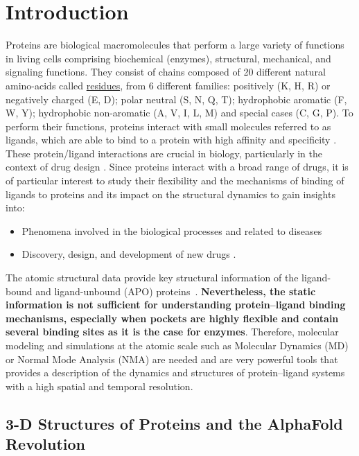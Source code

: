 \chapter{Introduction}
Proteins are biological macromolecules that perform a large variety of functions in living cells comprising biochemical (enzymes), structural, mechanical, and signaling functions. They consist of chains composed of 20 different natural amino-acids called \underline{residues}, from 6 different families: positively (K, H, R) or negatively charged (E, D); polar neutral (S, N, Q, T); hydrophobic aromatic (F, W, Y); hydrophobic non-aromatic (A, V, I, L, M) and special cases (C, G, P). To perform their functions, proteins interact with small molecules referred to as ligands, which are able to bind to a protein with high affinity and specificity \cite{du2016insights}. These protein/ligand interactions are crucial in biology, particularly in the context of drug design \cite{li2019predicting}. Since proteins interact with a broad range of drugs, it is of particular interest to study their flexibility and the mechanisms of binding of ligands to proteins and its impact on the structural dynamics to gain insights into:
\vspace{-.25cm}
\begin{itemize}
	\item Phenomena involved in the biological processes and related to diseases \cite{silva2010ligand}
	\vspace{-.25cm}
	\item Discovery, design, and development of new drugs \cite{payandeh2021ligand}.
\end{itemize}
\vspace{-.25cm}
The atomic structural data provide key structural information of the ligand-bound and ligand-unbound (APO) proteins~\cite{chakraborti2021all}. \textbf{Nevertheless, the static information is not sufficient for understanding protein–ligand binding mechanisms, especially when pockets are highly flexible and contain several binding sites as it is the case for enzymes}. Therefore, molecular modeling and simulations at the atomic scale such as Molecular Dynamics (MD) or Normal Mode Analysis (NMA) are needed and are very powerful tools that provides a description of the dynamics and structures of protein–ligand systems with a high spatial and temporal resolution.

\section{3-D Structures of Proteins and the AlphaFold Revolution}

